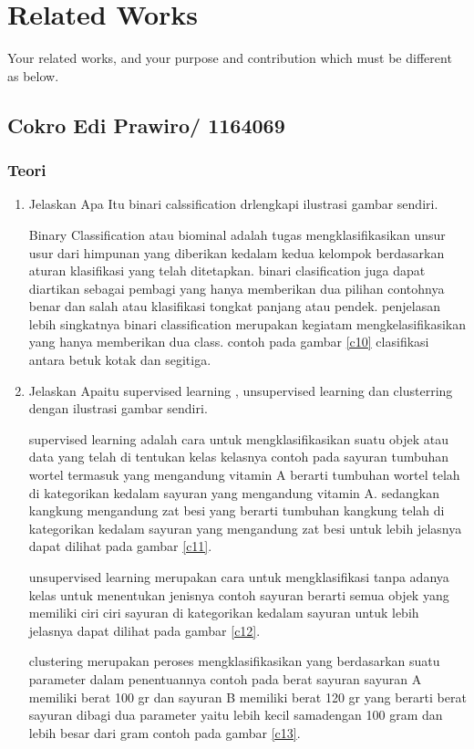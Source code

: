 \chapter{Related Works}

Your related works, and your purpose and contribution which must be different as below.

\section{Cokro Edi Prawiro/ 1164069}

\subsection{Teori}
\begin{enumerate}
\item Jelaskan Apa Itu binari calssification drlengkapi ilustrasi gambar sendiri.\par
Binary Classification atau biominal adalah tugas mengklasifikasikan unsur usur dari himpunan yang diberikan kedalam kedua kelompok berdasarkan aturan klasifikasi yang telah ditetapkan. binari clasification juga dapat diartikan sebagai pembagi yang hanya memberikan dua pilihan contohnya benar dan salah atau klasifikasi tongkat panjang atau pendek. penjelasan lebih singkatnya binari classification merupakan kegiatam mengkelasifikasikan yang hanya memberikan dua class. contoh pada gambar \ref{c10} clasifikasi antara betuk kotak dan segitiga.

\item Jelaskan Apaitu supervised learning , unsupervised learning dan clusterring dengan ilustrasi gambar sendiri.\par
supervised learning adalah cara untuk mengklasifikasikan suatu objek atau data yang telah di tentukan kelas kelasnya contoh pada sayuran tumbuhan wortel termasuk yang mengandung vitamin A berarti tumbuhan wortel telah di kategorikan kedalam sayuran yang mengandung vitamin A. sedangkan kangkung mengandung zat besi yang berarti tumbuhan kangkung telah di kategorikan kedalam sayuran yang mengandung zat besi untuk lebih jelasnya dapat dilihat pada gambar \ref{c11}.\par
unsupervised learning merupakan cara untuk mengklasifikasi tanpa adanya kelas untuk menentukan jenisnya contoh sayuran berarti semua objek yang memiliki ciri ciri sayuran di kategorikan kedalam sayuran untuk lebih jelasnya dapat dilihat pada gambar \ref{c12}.\par
clustering merupakan peroses mengklasifikasikan yang berdasarkan suatu parameter dalam penentuannya contoh pada berat sayuran sayuran A memiliki berat 100 gr dan sayuran B memiliki berat 120 gr yang berarti berat sayuran dibagi dua parameter yaitu lebih kecil samadengan 100 gram dan lebih besar dari gram contoh pada gambar \ref{c13}.\par


\end{enumerate}

